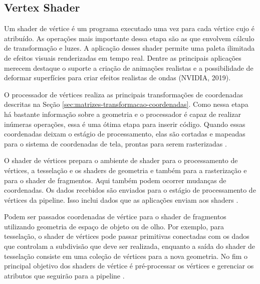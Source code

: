 \subsection{Vertex Shader}
\label{vertex-shader}

Um shader de vértice é um programa executado uma vez para cada vértice cujo é atribuído. As operações mais importante dessa etapa são as que envolvem cálculo de transformação e luzes. A aplicação desses shader permite uma paleta ilimitada de efeitos visuais renderizadas em tempo real. Dentre as principais aplicações merecem destaque o suporte a criação de animações realistas e a possibilidade de deformar superfícies para criar efeitos realistas de ondas (NVIDIA, 2019)\nocite{vertexShader}.

	\begin{figure}[h!]
		\centering
	\end{figure}
	\nocite{shaderStages}

O processador de vértices realiza as principais transformações de coordenadas descritas na Seção \ref{sec:matrizes-transformacao-coordenadas}. Como nessa etapa há bastante informação sobre a geometria e o processador é capaz de realizar inúmeras operações, essa é uma ótima etapa para inserir código. Quando essas coordenadas deixam o estágio de processamento, elas são cortadas e mapeadas para o sistema de coordenadas de tela, prontas para serem rasterizadas \cite{bailey2007}.

O shader de vértices prepara o ambiente de shader para o processamento de vértices, a tesselação e os shaders de geometria e também para a rasterização e para o shader de fragmentos. Aqui também podem ocorrer mudanças de coordenadas. Os dados recebidos são enviados para o estágio de processamento de vértices da pipeline. Isso inclui dados que as aplicações enviam aos shaders \cite{hasu2018modern}.

Podem ser passados coordenadas de vértice para o shader de fragmentos utilizando geometria de espaço de objeto ou de olho. Por exemplo, para tesselação, o shader de vértices pode passar primitivas conectadas com os dados que controlam a subdivisão que deve ser realizada, enquanto a saída do shader de tesselação consiste em uma coleção de vértices para a nova geometria. No fim o principal objetivo dos shaders de vértice é pré-processar os vértices e gerenciar os atributos que seguirão para a pipeline \cite{hasu2018modern}.

